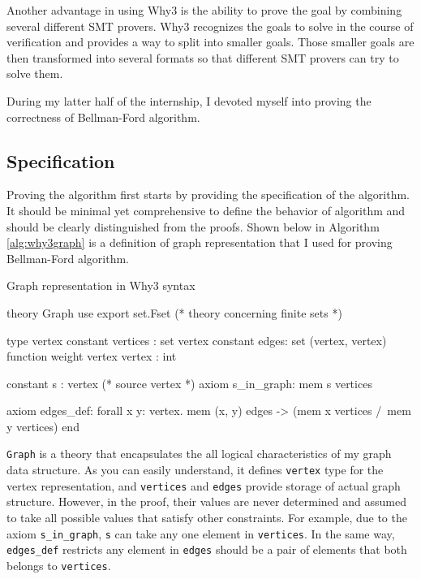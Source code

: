 \documentclass[a4paper,12pt]{article}
\begin{document}
Another advantage in using Why3 is the ability to prove the goal by
combining several different SMT provers. Why3 recognizes the goals to
solve in the course of verification and provides a way to split into
smaller goals. Those smaller goals are then transformed into several
formats so that different SMT provers can try to solve them.

During my latter half of the internship, I devoted myself into proving
the correctness of Bellman-Ford algorithm.

\subsection{Specification}

Proving the algorithm first starts by providing the specification of
the algorithm. It should be minimal yet comprehensive to define the
behavior of algorithm and should be clearly distinguished from the
proofs. Shown below in Algorithm \ref{alg:why3graph} is a definition
of graph representation that I used for proving Bellman-Ford
algorithm.

\begin{algorithm}
\caption{Graph representation in Why3 syntax}\label{alg:why3graph}
\begin{why3}
theory Graph
  use export set.Fset (* theory concerning finite sets *)

  type vertex
  constant vertices : set vertex
  constant edges: set (vertex, vertex)
  function weight vertex vertex : int

  constant s : vertex (* source vertex *)
  axiom s_in_graph: mem s vertices

  axiom edges_def:
    forall x y: vertex. mem (x, y) edges ->
    (mem x vertices /\ mem y vertices)
end
\end{why3}
\end{algorithm}

\texttt{Graph} is a theory that encapsulates the all logical
characteristics of my graph data structure. As you can easily
understand, it defines \texttt{vertex} type for the vertex
representation, and \texttt{vertices} and \texttt{edges} provide
storage of actual graph structure. However, in the proof, their values
are never determined and assumed to take all possible values that
satisfy other constraints. For example, due to the axiom
\texttt{s\_in\_graph}, \texttt{s} can take any one element in
\texttt{vertices}. In the same way, \texttt{edges\_def} restricts any
element in \texttt{edges} should be a pair of elements that both
belongs to \texttt{vertices}. 
\end{document}
